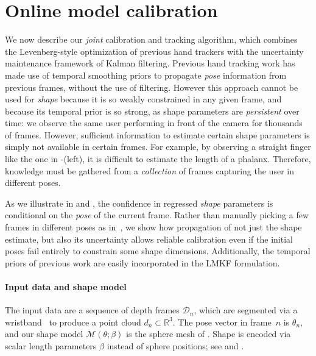 

\section{Online model calibration}
\label{sec:technical}

We now describe our \emph{joint} calibration and tracking algorithm, which combines the Levenberg-style optimization of previous hand trackers with the uncertainty maintenance framework of Kalman filtering.   Previous hand tracking work has made use of temporal smoothing priors to propagate {\em pose} information from previous frames, without the use of filtering.  However this approach cannot be used for {\em shape} because it is so weakly constrained in any given frame, and because its temporal prior is so strong, as shape parameters are \emph{persistent} over time: we observe the same user performing in front of the camera for thousands of frames. However, sufficient information to estimate certain shape parameters is simply not available in certain frames. For example, by observing a straight finger like the one in -(left), it is difficult to estimate the length of a phalanx. Therefore, knowledge must be 
gathered from a \emph{collection} of frames capturing the user in different poses. 

As we illustrate in  and , the confidence in regressed \emph{shape} parameters is conditional on the \emph{pose} of the current frame.
Rather than manually picking a few frames in different poses as in~\cite{taylor2016joint}, we show how propagation of not just the shape estimate, but also its uncertainty allows reliable calibration even if the initial poses fail entirely to constrain some shape dimensions.  Additionally, the temporal priors of previous work are easily incorporated in the LMKF formulation.




\paragraph{Input data and shape model}
The input data are a sequence of depth frames $\mathcal{D}_n$, which are segmented via a wristband~\cite{htrack} to produce a point cloud $d_n \subset \mathbb R^3$.   The pose vector in frame~$n$ is $\theta_n$, and our shape model $\mathcal{M}(\theta; \beta)$ is the sphere mesh of .   Shape is encoded via scalar length parameters $\beta$ instead of sphere positions; see  and \cite{edoardo}.

